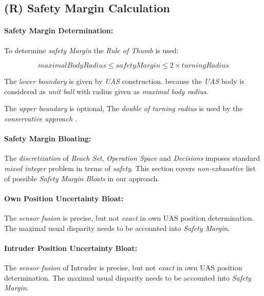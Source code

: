 \setcounter{chapter}{6}
\setcounter{section}{7}
\setcounter{subsection}{3}

\subsection{(R) Safety Margin Calculation}\label{s:safetyMarginCalculation}
\paragraph{Safety Margin Determination:} To determine \emph{safety Margin} the \emph{Rule of Thumb} is used:

\begin{equation}
    maximal Body Radius \le safety Margin \le 2 \times turning Radius
\end{equation}

\noindent The \emph{lower boundary} is given by \emph{UAS} construction. because the \emph{UAS} body is considered as \emph{unit ball} with radius given as \emph{maximal body radius}. 

The \emph{upper boundary} is optional, The \emph{double of \emph{turning radius}} is used by the \emph{conservative approach} \cite{borenstein1991vector}.


\paragraph{Safety Margin Bloating:}  The \emph{discretization} of \emph{Reach Set}, \emph{Operation Space} and \emph{Decisions} imposes standard \emph{mixed integer} problem in terms of \emph{safety}. This section covers \emph{non-exhaustive} list of possible \emph{Safety Margin Bloats} in our approach.

\paragraph{Own Position Uncertainty Bloat:} The \emph{sensor fusion} is precise, but not \emph{exact} in own UAS position determination. The maximal usual disparity needs to be accounted into \emph{Safety Margin}.

\paragraph{Intruder Position Uncertainty Bloat:} The \emph{sensor fusion} of Intruder is precise, but not \emph{exact} in own UAS position determination. The maximal usual disparity needs to be accounted into \emph{Safety Margin}.

